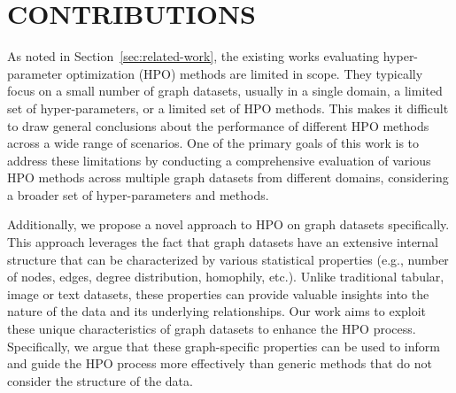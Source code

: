 \section{\uppercase{Contributions}}

As noted in Section~\ref{sec:related-work}, the existing works evaluating hyper-parameter optimization (HPO) methods are limited in scope. They typically focus on a small number of graph datasets, usually in a single domain, a limited set of hyper-parameters, or a limited set of HPO methods. This makes it difficult to draw general conclusions about the performance of different HPO methods across a wide range of scenarios. One of the primary goals of this work is to address these limitations by conducting a comprehensive evaluation of various HPO methods across multiple graph datasets from different domains, considering a broader set of hyper-parameters and methods.

Additionally, we propose a novel approach to HPO on graph datasets specifically. This approach leverages the fact that graph datasets have an extensive internal structure that can be characterized by various statistical properties (e.g., number of nodes, edges, degree distribution, homophily, etc.). Unlike traditional tabular, image or text datasets, these properties can provide valuable insights into the nature of the data and its underlying relationships. Our work aims to exploit these unique characteristics of graph datasets to enhance the HPO process. Specifically, we argue that these graph-specific properties can be used to inform and guide the HPO process more effectively than generic methods that do not consider the structure of the data.
